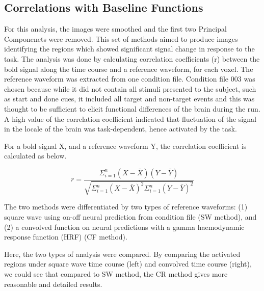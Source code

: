 \documentclass[11pt]{article}
\begin{document}
\subsection{Correlations with Baseline Functions}

For this analysis, the images were smoothed and the first two Principal Componenets were
removed. This set of methods aimed to produce images identifying the regions which showed
significant signal change in response to the task. The analysis was done by calculating 
correlation coefficients (r) between the bold signal along the time course and a reference
waveform, for each voxel. The reference waveform was extracted from one condition file.
Condition file 003 was chosen because while it did not contain all stimuli presented to the
subject, such as start and done cues, it included all target and non-target events and this
was thought to be sufficient to elicit functional differences of the brain during the run. 
A high value of the correlation coefficient indicated that fluctuation of the signal in 
the locale of the brain was task-dependent, hence activated by the task. 

For a bold signal X, and a reference waveform Y, the correlation coefficient is
calculated as below.

\begin{equation}
r = \frac{\Sigma_{i=1}^{n}  ( X-\bar{X}) ( Y-\bar{Y})}{\sqrt{ \Sigma_{i=1}^{n} (
    X-\bar{X} ) ^2 \Sigma_{i=1}^{n} ( Y-\bar{Y})  ^2 }}
\end{equation}

The two methods were differentiated by two types of reference
waveforms: (1) square wave using on-off neural prediction from condition file
(SW method), and (2) a convolved function on neural predictions with a gamma
haemodynamic response function (HRF) (CF method).

Here, the two types of analysis were compared. By comparing
the activated regions under square wave time course (left) and convolved time
course (right), we could see that compared to SW method, the CR method gives 
more reasonable and detailed results.
\end{document}
